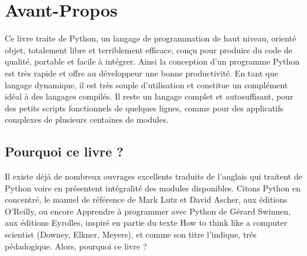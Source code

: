 \section{Avant-Propos}
Ce livre traite de Python, un langage de programmation de haut niveau, orienté objet,
totalement libre et terriblement efficace, conçu pour produire du code de qualité, 
portable et facile à intégrer. Ainsi la conception d'un programme Python est très rapide et
offre au développeur une bonne productivité. En tant que langage dynamique, il est
très souple d'utilisation et constitue un complément idéal à des langages compilés.
Il reste un langage complet et autosuffisant, pour des petits scripts fonctionnels de 
quelques lignes, comme pour des applicatifs complexes de plusieurs centaines de modules.

\subsection*{Pourquoi ce livre ?}
Il existe déjà de nombreux ouvrages excellents traduits de l'anglais qui traitent de
Python voire en présentent intégralité des modules disponibles. Citons Python en
concentré, le manuel de référence de Mark Lutz et David Ascher, aux éditions
O'Reilly, ou encore Apprendre à programmer avec Python de Gérard Swinnen, aux
éditions Eyrolles, inspiré en partie du texte How to think like a computer scientist
(Downey, Elkner, Meyers), et comme son titre l'indique, tr\'es p\'edadogique.
Alors, pourquoi ce livre ?